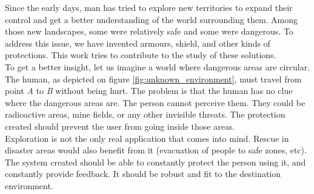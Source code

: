 \documentclass[oneside, a4paper, 12pt]{memoir}
\begin{document}
	Since the early days, man has tried to explore new territories to expand their control and get a better understanding of the world surrounding them. Among those new landscapes, some were relatively safe and some were dangerous. To address this issue, we have invented armours, shield, and other kinds of protections. This work tries to contribute to the study of these solutions.\\
	
	To get a better insight, let us imagine a world where dangerous areas are circular. The human, as depicted on figure \ref{fig:unknown_environment}, must travel from point \emph{A} to \emph{B} without being hurt. The problem is that the human has no clue where the dangerous areas are. The person cannot perceive them. They could be radioactive areas, mine fields, or any other invisible threats. The protection created should prevent the user from going inside those areas.\\
	
	Exploration is not the only real application that comes into mind. Rescue in disaster areas would also benefit from it (evacuation of people to safe zones, etc). The system created should be able to constantly protect the person using it, and constantly provide feedback. It should be robust and fit to the destination environment.
	
%			
%			
%			
	
\end{document}
